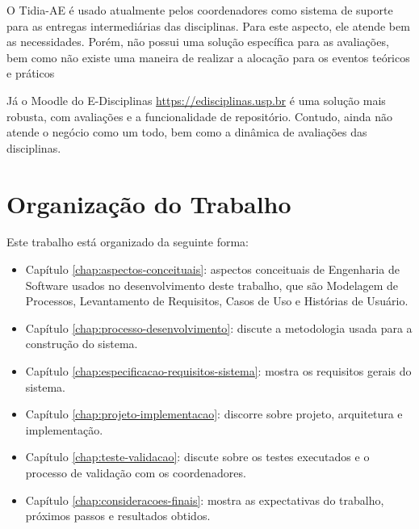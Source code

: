 O Tidia-AE é usado atualmente pelos coordenadores como sistema de suporte para as entregas intermediárias das disciplinas. Para este aspecto, ele atende bem as necessidades. Porém, não possui uma solução específica para as avaliações, bem como não existe uma maneira de realizar a alocação para os eventos teóricos e práticos

Já o Moodle do E-Disciplinas \href{https://edisciplinas.usp.br}{https://edisciplinas.usp.br} é uma solução mais robusta, com avaliações e a funcionalidade de repositório. Contudo, ainda não atende o negócio como um todo, bem como a dinâmica de avaliações das disciplinas.

\section{Organização do Trabalho}
Este trabalho está organizado da seguinte forma:

\begin{itemize}
    \item Capítulo \ref{chap:aspectos-conceituais}: aspectos conceituais de Engenharia de Software usados no desenvolvimento deste trabalho, que são Modelagem de Processos, Levantamento de Requisitos, Casos de Uso e Histórias de Usuário.
    \item Capítulo \ref{chap:processo-desenvolvimento}: discute a metodologia usada para a construção do sistema.
    \item Capítulo \ref{chap:especificacao-requisitos-sistema}: mostra os requisitos gerais do sistema.
    \item Capítulo \ref{chap:projeto-implementacao}: discorre sobre projeto, arquitetura e implementação.
    \item Capítulo \ref{chap:teste-validacao}: discute sobre os testes executados e o processo de validação com os coordenadores.
    \item Capítulo \ref{chap:consideracoes-finais}: mostra as expectativas do trabalho, próximos passos e resultados obtidos.
\end{itemize}
